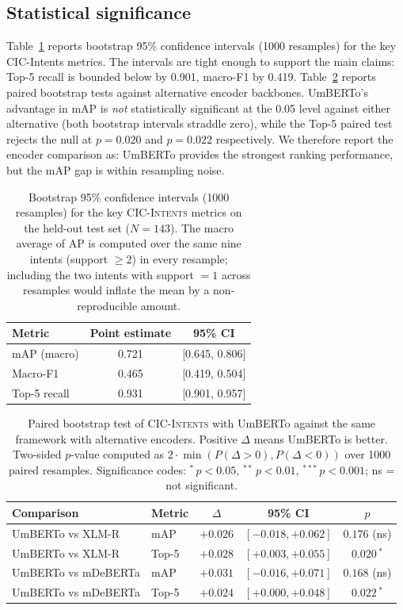 \documentclass[preprint,12pt,authoryear]{elsarticle}
\begin{document}
\subsection{Statistical significance}
\label{sec:stats}

Table~\ref{tab:ci} reports bootstrap 95\% confidence intervals
(1000 resamples) for the key CIC-Intents metrics. The intervals are
tight enough to support the main claims: Top-5 recall is bounded
below by 0.901, macro-F1 by 0.419. Table~\ref{tab:paired} reports
paired bootstrap tests against alternative encoder backbones.
UmBERTo's advantage in mAP is \emph{not} statistically significant
at the 0.05 level against either alternative (both bootstrap
intervals straddle zero), while the Top-5 paired test rejects the
null at $p = 0.020$ and $p = 0.022$ respectively. We therefore
report the encoder comparison as: UmBERTo provides the strongest
ranking performance, but the mAP gap is within resampling noise.

\begin{table}[t]
\centering
\caption{Bootstrap 95\% confidence intervals (1000 resamples) for the
key \textsc{CIC-Intents} metrics on the held-out test set ($N=143$).
The macro average of AP is computed over the same nine intents
(support $\geq 2$) in every resample; including the two intents with
support $=1$ across resamples would inflate the mean by a
non-reproducible amount.}
\label{tab:ci}
\begin{tabular}{lcc}
\toprule
\textbf{Metric} & \textbf{Point estimate} & \textbf{95\% CI} \\
\midrule
mAP (macro)  & 0.721 & [0.645, 0.806] \\
Macro-F1     & 0.465 & [0.419, 0.504] \\
Top-5 recall & 0.931 & [0.901, 0.957] \\
\bottomrule
\end{tabular}
\end{table}

\begin{table}[t]
\centering
\caption{Paired bootstrap test of \textsc{CIC-Intents} with UmBERTo
against the same framework with alternative encoders. Positive
$\Delta$ means UmBERTo is better. Two-sided $p$-value computed as
$2\cdot\min(P(\Delta>0), P(\Delta<0))$ over 1000 paired resamples.
Significance codes: $^{*}\,p<0.05$, $^{**}\,p<0.01$,
$^{***}\,p<0.001$; ns = not significant.}
\label{tab:paired}
\begin{tabular}{llccc}
\toprule
\textbf{Comparison} & \textbf{Metric} & \textbf{$\Delta$} & \textbf{95\% CI} & \textbf{$p$} \\
\midrule
UmBERTo vs XLM-R    & mAP   & $+0.026$ & $[-0.018, +0.062]$ & $0.176$ (ns) \\
UmBERTo vs XLM-R    & Top-5 & $+0.028$ & $[+0.003, +0.055]$ & $0.020$\,$^{*}$ \\
UmBERTo vs mDeBERTa & mAP   & $+0.031$ & $[-0.016, +0.071]$ & $0.168$ (ns) \\
UmBERTo vs mDeBERTa & Top-5 & $+0.024$ & $[+0.000, +0.048]$ & $0.022$\,$^{*}$ \\
\bottomrule
\end{tabular}
\end{table}
\end{document}
